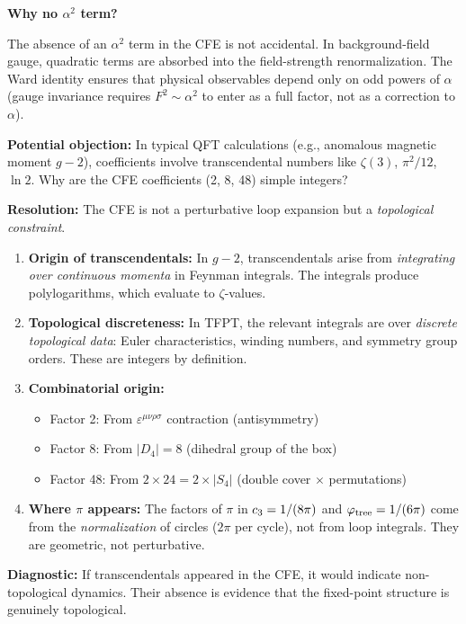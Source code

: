 \textbf{Why no $\alpha^2$ term?}

The absence of an $\alpha^2$ term in the CFE is not accidental. In background-field gauge, 
quadratic terms are absorbed into the field-strength renormalization. The Ward identity 
ensures that physical observables depend only on odd powers of $\alpha$ (gauge invariance 
requires $F^2 \sim \alpha^2$ to enter as a full factor, not as a correction to $\alpha$).

\begin{tcolorbox}[colback=purple!3, colframe=purple!50!black, 
    title={\textbf{Why Integer Coefficients? (No $\zeta(3)$, $\ln 2$, etc.)}}, fonttitle=\bfseries\small]
\textbf{Potential objection:} In typical QFT calculations (e.g., anomalous magnetic moment $g-2$), 
coefficients involve transcendental numbers like $\zeta(3)$, $\pi^2/12$, $\ln 2$. Why are the 
CFE coefficients (2, 8, 48) simple integers?

\textbf{Resolution:} The CFE is not a perturbative loop expansion but a \emph{topological constraint}.

\begin{enumerate}[leftmargin=1.5em, topsep=2pt, itemsep=1pt]
    \item \textbf{Origin of transcendentals:} In $g-2$, transcendentals arise from 
        \emph{integrating over continuous momenta} in Feynman integrals. The integrals 
        produce polylogarithms, which evaluate to $\zeta$-values.
    
    \item \textbf{Topological discreteness:} In TFPT, the relevant integrals are over 
        \emph{discrete topological data}: Euler characteristics, winding numbers, and 
        symmetry group orders. These are integers by definition.
    
    \item \textbf{Combinatorial origin:}
        \begin{itemize}[leftmargin=1em, topsep=1pt, itemsep=1pt]
            \item Factor 2: From $\varepsilon^{\mu\nu\rho\sigma}$ contraction (antisymmetry)
            \item Factor 8: From $|D_4| = 8$ (dihedral group of the box)
            \item Factor 48: From $2 \times 24 = 2 \times |S_4|$ (double cover $\times$ permutations)
        \end{itemize}
    
    \item \textbf{Where $\pi$ appears:} The factors of $\pi$ in $c_3 = 1/(8\pi)$ and 
        $\varphi_{\mathrm{tree}} = 1/(6\pi)$ come from the \emph{normalization} of circles ($2\pi$ per cycle), 
        not from loop integrals. They are geometric, not perturbative.
\end{enumerate}

\textbf{Diagnostic:} If transcendentals appeared in the CFE, it would indicate non-topological 
dynamics. Their absence is evidence that the fixed-point structure is genuinely topological.
\end{tcolorbox}

